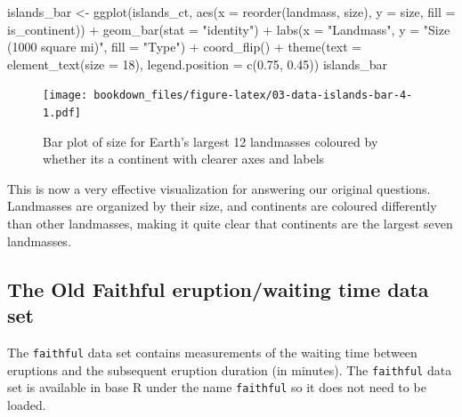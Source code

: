 \documentclass[
]{krantz}
\makeatletter
\newenvironment{Shaded}{\begin{snugshade}}{\end{snugshade}}
\newcommand{\AttributeTok}[1]{\textcolor[rgb]{0.61,0.61,0.61}{#1}}
\newcommand{\DecValTok}[1]{\textcolor[rgb]{0.06,0.06,0.06}{#1}}
\newcommand{\FloatTok}[1]{\textcolor[rgb]{0.06,0.06,0.06}{#1}}
\newcommand{\FunctionTok}[1]{\textcolor[rgb]{0,0,0}{#1}}
\newcommand{\NormalTok}[1]{#1}
\newcommand{\OtherTok}[1]{\textcolor[rgb]{0.37,0.37,0.37}{#1}}
\newcommand{\SpecialCharTok}[1]{\textcolor[rgb]{0,0,0}{#1}}
\newcommand{\StringTok}[1]{\textcolor[rgb]{0.5,0.5,0.5}{#1}}
\newenvironment{kframe}{%
\medskip{}
\setlength{\fboxsep}{.8em}
 \def\at@end@of@kframe{}%
 \ifinner\ifhmode%
  \def\at@end@of@kframe{\end{minipage}}%
  \begin{minipage}{\columnwidth}%
 \fi\fi%
 \def\FrameCommand##1{\hskip\@totalleftmargin \hskip-\fboxsep
 \colorbox{shadecolor}{##1}\hskip-\fboxsep
     \hskip-\linewidth \hskip-\@totalleftmargin \hskip\columnwidth}%
 \MakeFramed {\advance\hsize-\width
   \@totalleftmargin\z@ \linewidth\hsize
   \@setminipage}}%
 {\par\unskip\endMakeFramed%
 \at@end@of@kframe}
\renewenvironment{Shaded}{\begin{kframe}}{\end{kframe}}
\makeatother
\begin{document}
\begin{Shaded}
\begin{Highlighting}[]
\NormalTok{islands\_bar }\OtherTok{\textless{}{-}} \FunctionTok{ggplot}\NormalTok{(islands\_ct, }\FunctionTok{aes}\NormalTok{(}\AttributeTok{x =} \FunctionTok{reorder}\NormalTok{(landmass, size), }\AttributeTok{y =}\NormalTok{ size, }\AttributeTok{fill =}\NormalTok{ is\_continent)) }\SpecialCharTok{+}
  \FunctionTok{geom\_bar}\NormalTok{(}\AttributeTok{stat =} \StringTok{"identity"}\NormalTok{) }\SpecialCharTok{+}
  \FunctionTok{labs}\NormalTok{(}\AttributeTok{x =} \StringTok{"Landmass"}\NormalTok{, }\AttributeTok{y =} \StringTok{"Size (1000 square mi)"}\NormalTok{, }\AttributeTok{fill =} \StringTok{"Type"}\NormalTok{) }\SpecialCharTok{+}
  \FunctionTok{coord\_flip}\NormalTok{() }\SpecialCharTok{+}
  \FunctionTok{theme}\NormalTok{(}\AttributeTok{text =} \FunctionTok{element\_text}\NormalTok{(}\AttributeTok{size =} \DecValTok{18}\NormalTok{), }\AttributeTok{legend.position =} \FunctionTok{c}\NormalTok{(}\FloatTok{0.75}\NormalTok{, }\FloatTok{0.45}\NormalTok{))}
\NormalTok{islands\_bar}
\end{Highlighting}
\end{Shaded}

\begin{figure}
\centering
\texttt{[image: bookdown\_files/figure-latex/03-data-islands-bar-4-1.pdf]}
\caption{\label{fig:03-data-islands-bar-4}Bar plot of size for Earth's largest 12 landmasses coloured by whether its a continent with clearer axes and labels}
\end{figure}

This is now a very effective visualization for answering our original questions. Landmasses are organized by their size,
and continents are coloured differently than other landmasses, making it quite clear that continents are the largest seven landmasses.

\hypertarget{the-old-faithful-eruptionwaiting-time-data-set}{%
\subsection{The Old Faithful eruption/waiting time data set}\label{the-old-faithful-eruptionwaiting-time-data-set}}

The \texttt{faithful} data set contains measurements of the waiting time between eruptions and the subsequent eruption duration (in minutes). The \texttt{faithful} data set is available in base R under the name \texttt{faithful} so it does not need to be loaded.
\end{document}

